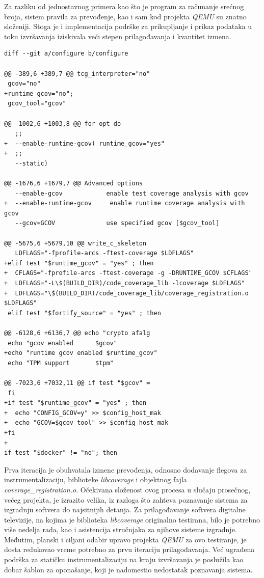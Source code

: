 \documentclass[12pt,oneside]{memoir}
\newcommand{\strano}[1]{\textit{#1}}
\begin{document}
Za razliku od jednostavnog primera kao što je program za računanje srećnog broja, sistem pravila za prevođenje, kao i sam kod projekta \strano{QEMU} su znatno složeniji. Stoga je i implementacija podrške za prikupljanje i prikaz podataka u toku izvršavanja iziskivala veći stepen prilagođavanja i kvantitet izmena. 
\\

\begin{lstlisting}[caption={Izmene skripte \strano{configure}},frame=single, label=qemu-diff-1]
diff --git a/configure b/configure

@@ -389,6 +389,7 @@ tcg_interpreter="no"
 gcov="no"
+runtime_gcov="no";
 gcov_tool="gcov"

@@ -1002,6 +1003,8 @@ for opt do
   ;;
+  --enable-runtime-gcov) runtime_gcov="yes"
+  ;;
   --static)

@@ -1676,6 +1679,7 @@ Advanced options 
   --enable-gcov            enable test coverage analysis with gcov
+  --enable-runtime-gcov     enable runtime coverage analysis with gcov
   --gcov=GCOV              use specified gcov [$gcov_tool]

@@ -5675,6 +5679,10 @@ write_c_skeleton
   LDFLAGS="-fprofile-arcs -ftest-coverage $LDFLAGS"
+elif test "$runtime_gcov" = "yes" ; then
+  CFLAGS="-fprofile-arcs -ftest-coverage -g -DRUNTIME_GCOV $CFLAGS"
+  LDFLAGS="-L\$(BUILD_DIR)/code_coverage_lib -lcoverage $LDFLAGS"
+  LDFLAGS="\$(BUILD_DIR)/code_coverage_lib/coverage_registration.o $LDFLAGS"
 elif test "$fortify_source" = "yes" ; then
 
@@ -6128,6 +6136,7 @@ echo "crypto afalg      
 echo "gcov enabled      $gcov"
+echo "runtime gcov enabled $runtime_gcov"
 echo "TPM support       $tpm"

@@ -7023,6 +7032,11 @@ if test "$gcov" = 
 fi
+if test "$runtime_gcov" = "yes" ; then
+  echo "CONFIG_GCOV=y" >> $config_host_mak
+  echo "GCOV=$gcov_tool" >> $config_host_mak
+fi
+
if test "$docker" != "no"; then
\end{lstlisting}

Prva iteracija je obuhvatala izmene prevođenja, odnosno dodavanje flegova za instrumentalizaciju, biblioteke \strano{libcoverage} i objektnog fajla \strano{coverage\_registration.o}. 
Očekivana složenost ovog procesa u slučaju prosečnog, većeg projekta, je izrazito velika, iz razloga što zahteva poznavanje sistema za izgradnju softvera do najsitnijih detanja. Za prilagođavanje softvera digitalne televizije, na kojima je biblioteka \strano{libcoverage} originalno testirana, bilo je potrebno više nedelja rada, kao i asistencija stručnjaka za njihove sisteme izgradnje. Međutim, planski i ciljani odabir upravo projekta \strano{QEMU} za ovo testiranje, je dosta redukovao vreme potrebno za prvu iteraciju prilagođavanja. Već ugrađena podrška za statičku instrumentalizaciju na kraju izvršavanja je poslužila kao dobar šablon za oponašanje, koji je nadomestio nedostatak poznavanja sistema. 
\end{document}
